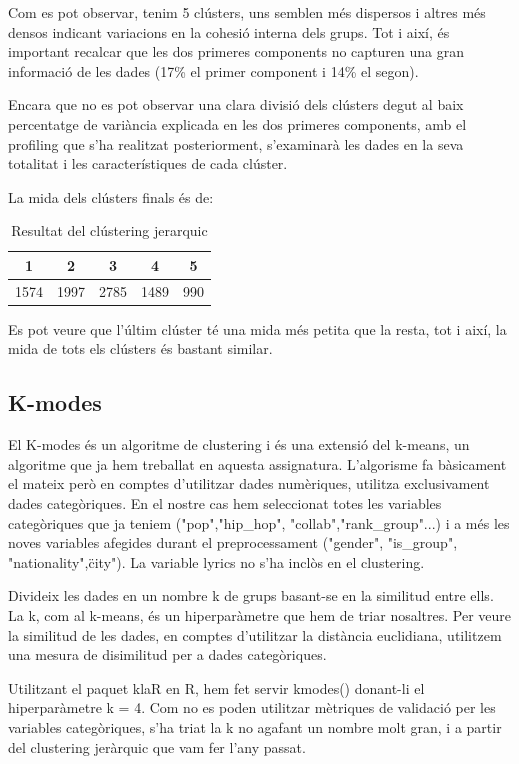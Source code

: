 Com es pot observar, tenim 5 clústers, uns semblen més dispersos i altres més densos indicant variacions en la cohesió interna dels grups. Tot i així, és important recalcar que les dos primeres components no capturen una gran informació de les dades (17\% el primer component i 14\% el segon).

Encara que no es pot observar una clara divisió dels clústers degut al baix percentatge de variància explicada en les dos primeres components, amb  el profiling que s'ha realitzat posteriorment, s'examinarà les dades en la seva totalitat i les característiques de cada clúster.   

La mida dels clústers finals és de:
\begin{table}[H]
\centering
\begin{tabular}{|c|c|c|c|c|}
\hline
1    & 2    & 3   & 4   & 5 \\ \hline
1574 & 1997 & 2785 & 1489  & 990  \\ \hline
\end{tabular}
\caption{Resultat del clústering jerarquic}
\label{tab:clustering_results}
\end{table}

Es pot veure que l'últim clúster té una mida més petita que la resta, tot i així, la mida de tots els clústers és bastant similar.

\subsection{K-modes}

El K-modes és un algoritme de clustering i és una extensió del k-means, un algoritme que ja hem treballat en aquesta assignatura. L'algorisme fa bàsicament el mateix però en comptes d'utilitzar dades numèriques, utilitza exclusivament dades categòriques. En el nostre cas hem seleccionat totes les variables categòriques que ja teniem ("pop","hip\_hop", "collab","rank\_group"...) i a més les noves variables afegides durant el preprocessament ("gender", "is\_group", "nationality",\"city"). La variable lyrics no s'ha inclòs en el clustering.

Divideix les dades en un nombre k de grups basant-se en la similitud entre ells. La k, com al k-means, és un hiperparàmetre que hem de triar nosaltres. Per veure la similitud de les dades, en comptes d'utilitzar la distància euclidiana, utilitzem una mesura de disimilitud per a dades categòriques.

Utilitzant el paquet klaR en R, hem fet servir kmodes() donant-li el hiperparàmetre k = 4. Com no es poden utilitzar mètriques de validació per les variables categòriques, s'ha triat la k no agafant un nombre molt gran, i a partir del clustering jeràrquic que vam fer l'any passat. 


